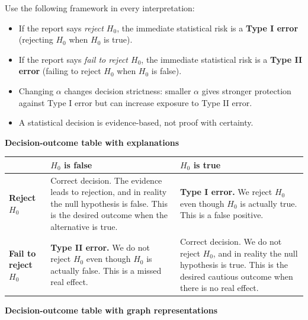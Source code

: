 	Use the following framework in every interpretation:
	\begin{itemize}
		\item If the report says \textit{reject \(H_0\)}, the immediate statistical risk is a \textbf{Type I error} (rejecting \(H_0\) when \(H_0\) is true).
		\item If the report says \textit{fail to reject \(H_0\)}, the immediate statistical risk is a \textbf{Type II error} (failing to reject \(H_0\) when \(H_0\) is false).
		\item Changing \(\alpha\) changes decision strictness: smaller \(\alpha\) gives stronger protection against Type I error but can increase exposure to Type II error.
		\item A statistical decision is evidence-based, not proof with certainty.
	\end{itemize}
	
	\noindent\textbf{Decision-outcome table with explanations}
	
	\renewcommand{\arraystretch}{1.4}
	\begin{center}
		\begin{tabular}{|p{3.4cm}|p{5.6cm}|p{5.6cm}|}
			\hline
			& \centering\textbf{\(H_0\) is false} & \centering\textbf{\(H_0\) is true} \tabularnewline
			\hline
			\textbf{Reject \(H_0\)} 
			& Correct decision. The evidence leads to rejection, and in reality the null hypothesis is false. This is the desired outcome when the alternative is true. 
			& \textbf{Type I error.} We reject \(H_0\) even though \(H_0\) is actually true. This is a false positive. \tabularnewline
			\hline
			\textbf{Fail to reject \(H_0\)} 
			& \textbf{Type II error.} We do not reject \(H_0\) even though \(H_0\) is actually false. This is a missed real effect. 
			& Correct decision. We do not reject \(H_0\), and in reality the null hypothesis is true. This is the desired cautious outcome when there is no real effect. \tabularnewline
			\hline
		\end{tabular}
	\end{center}
	
	\medskip
	
	\noindent\textbf{Decision-outcome table with graph representations}
	
